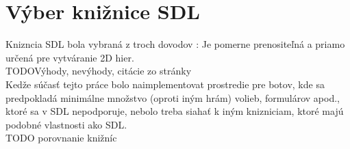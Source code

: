 \section {Výber knižnice SDL}
Knizncia SDL bola vybraná z troch dovodov : Je pomerne prenositeľná a priamo určená pre vytváranie 2D hier. \\
\huge TODO\normalsize {Výhody, nevýhody, citácie zo stránky} \\
Kedže súčasť tejto práce bolo naimplementovat prostredie pre botov, kde sa predpokladá minimálne množstvo (oproti iným hrám) volieb, formulárov apod., ktoré sa v SDL nepodporuje, nebolo treba siahať k iným knizniciam, ktoré majú podobné vlastnosti ako SDL. \\
\huge TODO \normalsize porovnanie knižníc
\newpage
